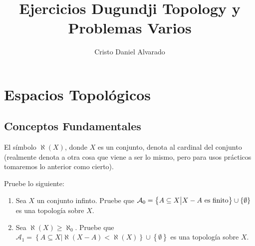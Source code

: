 \documentclass[12pt]{report}
\theoremstyle{largebreak}
\begin{document}
    \title{Ejercicios Dugundji Topology y Problemas Varios}
    \author{Cristo Daniel Alvarado}
    \maketitle

    \tableofcontents %


    \chapter{Espacios Topológicos}

    \section{Conceptos Fundamentales}

    \begin{obs}
        El símbolo $\aleph(X)$, donde $X$ es un conjunto, denota al cardinal del conjunto (realmente denota a otra cosa que viene a ser lo mismo, pero para usos prácticos tomaremos lo anterior como cierto).
    \end{obs}

    \begin{excer}
        Pruebe lo siguiente:
        \begin{enumerate}
            \item Sea $X$ un conjunto infinto. Pruebe que $\mathcal{A}_0=\left\{A\subseteq X \big|X-A\textup{ es finito} \right\}\cup\left\{\emptyset \right\}$ es una topología sobre $X$.
            \item Sea $\aleph(X)\geq\aleph_0$. Pruebe que $\mathcal{A}_1=\left\{A\subseteq X \big|\aleph(X-A)<\aleph(X) \right\}\cup\left\{\emptyset \right\}$ es una topología sobre $X$.
        \end{enumerate}
    \end{excer}
\end{document}

